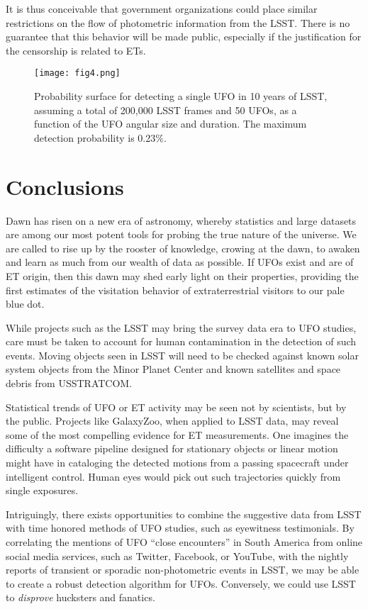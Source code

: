 \documentclass[iop]{emulateapj}
\begin{document}
It is thus conceivable that government organizations could place similar restrictions on the flow of photometric information from the LSST. There is no guarantee that this behavior will be made public, especially if the justification for the censorship is related to ETs.


\begin{figure}[]
\texttt{[image: fig4.png]}
\caption{Probability surface for detecting a single UFO  in 10 years of LSST, assuming a total of 200,000 LSST frames and 50 UFOs, as a function of the UFO angular size and duration. The maximum detection probability is 0.23\%.}
\label{prob}
\end{figure}

\section{Conclusions}
Dawn has risen on a new era of astronomy, whereby statistics and large datasets are among our most potent tools for probing the true nature of the universe. We are called to rise up by the rooster of knowledge, crowing at the dawn, to awaken and learn as much from our wealth of data as possible. If UFOs exist and are of ET origin, then this dawn may shed early light on their properties, providing the first estimates of the visitation behavior of extraterrestrial visitors to our pale blue dot.

While projects such as the LSST may bring the survey data era to UFO studies, care must be taken to account for human contamination in the detection of such events. Moving objects seen in LSST will need to be checked against known solar system objects from the Minor Planet Center \citep{mpc} and known satellites and space debris from USSTRATCOM. 

Statistical trends of UFO or ET activity may be seen not by scientists, but by the public. Projects like GalaxyZoo, when applied to LSST data, may reveal some of the most compelling evidence for ET measurements. One imagines the difficulty a software pipeline designed for stationary objects or linear motion might have in cataloging the detected motions from a passing spacecraft under intelligent control. Human eyes would pick out such trajectories quickly from single exposures.

Intriguingly, there exists opportunities to combine the suggestive data from LSST with time honored methods of UFO studies, such as eyewitness testimonials. By correlating the mentions of UFO ``close encounters'' \citep{hynek1972} in South America from online social media services, such as Twitter, Facebook, or YouTube, with the nightly reports of transient or sporadic non-photometric events in LSST, we may be able to create a robust detection algorithm for UFOs. Conversely, we could use LSST to {\it disprove} hucksters and fanatics.
\end{document}
